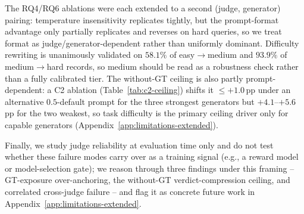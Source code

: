 The RQ4/RQ6 ablations were each extended to a second (judge, generator) pairing: temperature insensitivity replicates tightly, but the prompt-format advantage only partially replicates and reverses on hard queries, so we treat format as judge/generator-dependent rather than uniformly dominant. Difficulty rewriting is unanimously validated on $58.1\%$ of easy$\to$medium and $93.9\%$ of medium$\to$hard records, so medium should be read as a robustness check rather than a fully calibrated tier. The without-GT ceiling is also partly prompt-dependent: a C2 ablation (Table~\ref{tab:c2-ceiling}) shifts it $\leq{+1.0}$\,pp under an alternative $0.5$-default prompt for the three strongest generators but $+4.1$--$+5.6$\,pp for the two weakest, so task difficulty is the primary ceiling driver only for capable generators (Appendix~\ref{app:limitations-extended}).

Finally, we study judge reliability at evaluation time only and do not test whether these failure modes carry over as a training signal (e.g., a reward model or model-selection gate); we reason through three findings under this framing -- GT-exposure over-anchoring, the without-GT verdict-compression ceiling, and correlated cross-judge failure -- and flag it as concrete future work in Appendix~\ref{app:limitations-extended}.

